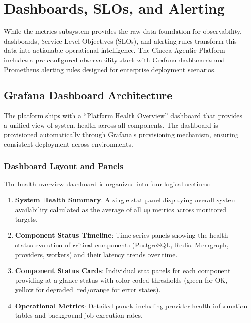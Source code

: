
\section{Dashboards, SLOs, and Alerting}
\label{sec:dashboards-slos-alerting}

While the metrics subsystem provides the raw data foundation for observability, dashboards, Service Level Objectives (SLOs), and alerting rules transform this data into actionable operational intelligence. The Cineca Agentic Platform includes a pre-configured observability stack with Grafana dashboards and Prometheus alerting rules designed for enterprise deployment scenarios.

\subsection{Grafana Dashboard Architecture}

The platform ships with a ``Platform Health Overview'' dashboard that provides a unified view of system health across all components. The dashboard is provisioned automatically through Grafana's provisioning mechanism, ensuring consistent deployment across environments.

\subsubsection{Dashboard Layout and Panels}

The health overview dashboard is organized into four logical sections:

\begin{enumerate}
    \item \textbf{System Health Summary}: A single stat panel displaying overall system availability calculated as the average of all \texttt{up} metrics across monitored targets.
    
    \item \textbf{Component Status Timeline}: Time-series panels showing the health status evolution of critical components (PostgreSQL, Redis, Memgraph, providers, workers) and their latency trends over time.
    
    \item \textbf{Component Status Cards}: Individual stat panels for each component providing at-a-glance status with color-coded thresholds (green for OK, yellow for degraded, red/orange for error states).
    
    \item \textbf{Operational Metrics}: Detailed panels including provider health information tables and background job execution rates.
\end{enumerate}

